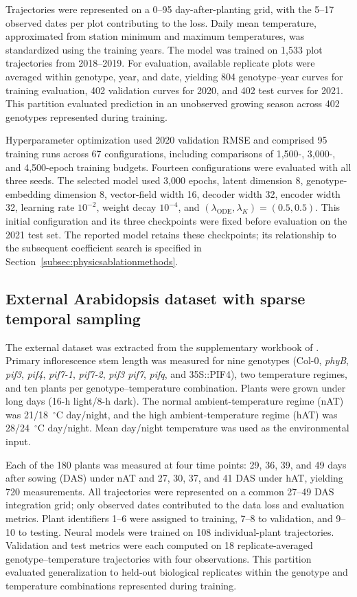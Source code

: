 \documentclass[preprint,12pt,authoryear]{elsarticle}
\begin{document}
Trajectories were represented on a 0--95 day-after-planting grid, with the 5--17 observed dates per plot contributing to the loss. Daily mean temperature, approximated from station minimum and maximum temperatures, was standardized using the training years. The model was trained on 1,533 plot trajectories from 2018--2019. For evaluation, available replicate plots were averaged within genotype, year, and date, yielding 804 genotype--year curves for training evaluation, 402 validation curves for 2020, and 402 test curves for 2021. This partition evaluated prediction in an unobserved growing season across 402 genotypes represented during training.

Hyperparameter optimization used 2020 validation RMSE and comprised 95 training runs across 67 configurations, including comparisons of 1,500-, 3,000-, and 4,500-epoch training budgets. Fourteen configurations were evaluated with all three seeds. The selected model used 3,000 epochs, latent dimension 8, genotype-embedding dimension 8, vector-field width 16, decoder width 32, encoder width 32, learning rate $10^{-2}$, weight decay $10^{-4}$, and $(\lambda_{\mathrm{ODE}},\lambda_K)=(0.5,0.5)$. This initial configuration and its three checkpoints were fixed before evaluation on the 2021 test set. The reported model retains these checkpoints; its relationship to the subsequent coefficient search is specified in Section~\ref{subsec:physicsablationmethods}.

\subsection{External Arabidopsis dataset with sparse temporal sampling}
\label{subsec:arabdata}

The external dataset was extracted from the supplementary workbook of \citet{naghani2024arabidopsis}. Primary inflorescence stem length was measured for nine genotypes (Col-0, \textit{phyB}, \textit{pif3}, \textit{pif4}, \textit{pif7-1}, \textit{pif7-2}, \textit{pif3 pif7}, \textit{pifq}, and 35S::PIF4), two temperature regimes, and ten plants per genotype--temperature combination. Plants were grown under long days (16-h light/8-h dark). The normal ambient-temperature regime (nAT) was 21/18~$^{\circ}$C day/night, and the high ambient-temperature regime (hAT) was 28/24~$^{\circ}$C day/night. Mean day/night temperature was used as the environmental input.

Each of the 180 plants was measured at four time points: 29, 36, 39, and 49 days after sowing (DAS) under nAT and 27, 30, 37, and 41 DAS under hAT, yielding 720 measurements. All trajectories were represented on a common 27--49 DAS integration grid; only observed dates contributed to the data loss and evaluation metrics. Plant identifiers 1--6 were assigned to training, 7--8 to validation, and 9--10 to testing. Neural models were trained on 108 individual-plant trajectories. Validation and test metrics were each computed on 18 replicate-averaged genotype--temperature trajectories with four observations. This partition evaluated generalization to held-out biological replicates within the genotype and temperature combinations represented during training.
\end{document}
